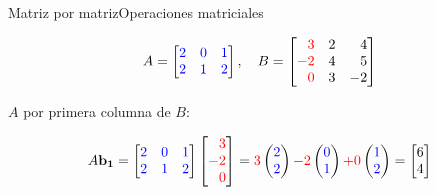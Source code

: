 \documentclass[spanish, c]{beamer}
\begin{document}
\begin{frame}{Matriz por matriz}{Operaciones matriciales}

    \[%
        A = %
        \begin{bmatrix*}[r]
            \color{blue} 2 & \color{blue} 0 & \color{blue} 1 \\
            \color{blue} 2 & \color{blue} 1 & \color{blue} 2
        \end{bmatrix*},
        \quad B = %
        \begin{bmatrix*}[r]
            \color{red} 3 & 2 & 4 \\
            \color{red} -2 & 4 & 5 \\
            \color{red} 0 & 3 & -2
        \end{bmatrix*}
    \]

    \bigskip

    $A$ por primera columna de $B$:

    \[%
        A\mathbf{b_1} =
        \begin{bmatrix*}[r]
            \color{blue} 2 & \color{blue} 0 & \color{blue} 1 \\
            \color{blue} 2 & \color{blue} 1 & \color{blue} 2
        \end{bmatrix*}
        \begin{bmatrix*}[r]
            \color{red} 3 \\ \color{red} -2 \\ \color{red} 0
        \end{bmatrix*}
        = {\color{red} 3} %
        \begin{pmatrix*}[r]
            \color{blue} 2 \\ \color{blue} 2
        \end{pmatrix*}
        {\color{red} -2} %
        \begin{pmatrix*}[r]
            \color{blue} 0 \\ \color{blue} 1
        \end{pmatrix*}
        {\color{red} + 0} %
        \begin{pmatrix*}[r]
            \color{blue} 1 \\ \color{blue} 2
        \end{pmatrix*}
        = %
        \begin{bmatrix*}[r]
            6 \\ 4
        \end{bmatrix*}
    \]
\end{frame}
\end{document}

